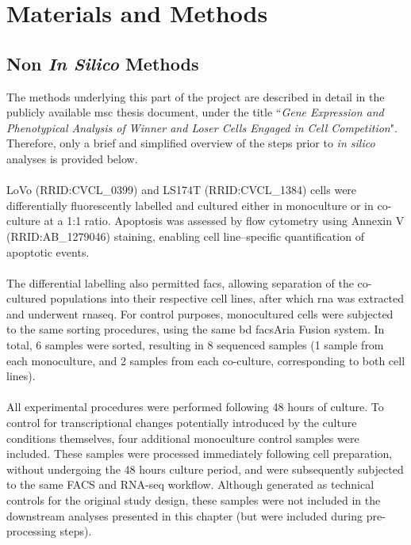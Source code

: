 \section{Materials and Methods}

\subsection{Non \textit{In Silico} Methods}
 
The methods underlying this part of the project are described in detail in the publicly available \gls{msc} thesis document, under the title ``\textit{Gene Expression and Phenotypical Analysis of Winner and Loser Cells Engaged in Cell Competition}". Therefore, only a brief and simplified overview of the steps prior to \textit{in silico} analyses is provided below.
\\
\\
LoVo (RRID:CVCL\_0399) and LS174T (RRID:CVCL\_1384) cells were differentially fluorescently labelled and cultured either in monoculture or in co-culture at a 1:1 ratio. Apoptosis was assessed by flow cytometry using Annexin V (RRID:AB\_1279046) staining, enabling cell line–specific quantification of apoptotic events.
\\
\\
The differential labelling also permitted \gls{facs}, allowing separation of the co-cultured populations into their respective cell lines, after which \gls{rna} was extracted and underwent \gls{rnaseq}. For control purposes, monocultured cells were subjected to the same sorting procedures, using the same \gls{bd} \gls{facs}Aria Fusion system. In total, 6 samples were sorted, resulting in 8 sequenced samples (1 sample from each monoculture, and 2 samples from each co-culture, corresponding to both cell lines).
\\
\\
All experimental procedures were performed following 48 hours of culture. To control for transcriptional changes potentially introduced by the culture conditions themselves, four additional monoculture control samples were included. These samples were processed immediately following cell preparation, without undergoing the 48 hours culture period, and were subsequently subjected to the same FACS and RNA-seq workflow. Although generated as technical controls for the original study design, these samples were not included in the downstream analyses presented in this chapter (but were included during pre-processing steps).

